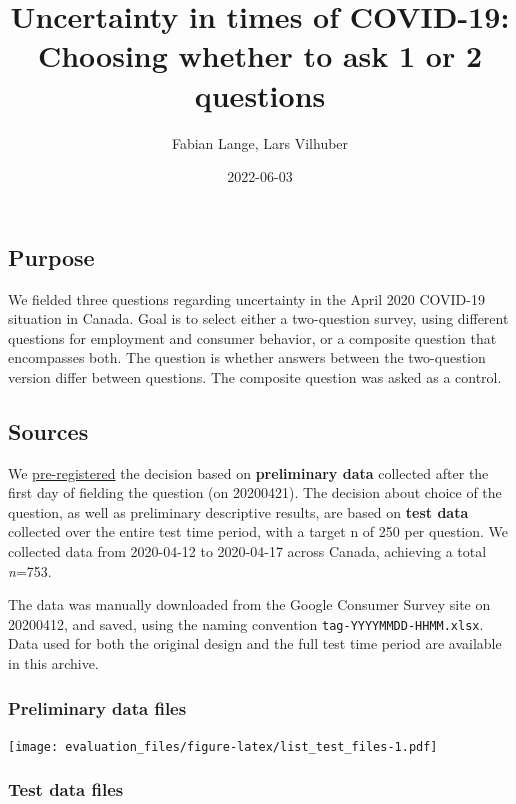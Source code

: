 \documentclass[
]{article}
\title{Uncertainty in times of COVID-19: Choosing whether to ask 1 or 2
questions}
\author{Fabian Lange, Lars Vilhuber}
\date{2022-06-03}
\begin{document}
\maketitle

{
\setcounter{tocdepth}{2}
\tableofcontents
}
\hypertarget{purpose}{%
\subsection{Purpose}\label{purpose}}

We fielded three questions regarding uncertainty in the April 2020
COVID-19 situation in Canada. Goal is to select either a two-question
survey, using different questions for employment and consumer behavior,
or a composite question that encompasses both. The question is whether
answers between the two-question version differ between questions. The
composite question was asked as a control.

\hypertarget{sources}{%
\subsection{Sources}\label{sources}}

We \href{https://osf.io/729nr}{pre-registered} the decision based on
\textbf{preliminary data} collected after the first day of fielding the
question (on 20200421). The decision about choice of the question, as
well as preliminary descriptive results, are based on \textbf{test data}
collected over the entire test time period, with a target n of 250 per
question. We collected data from 2020-04-12 to 2020-04-17 across Canada,
achieving a total \emph{n}=753.

The data was manually downloaded from the Google Consumer Survey site on
20200412, and saved, using the naming convention
\texttt{tag-YYYYMMDD-HHMM.xlsx}. Data used for both the original design
and the full test time period are available in this archive.

\hypertarget{preliminary-data-files}{%
\subsubsection{Preliminary data files}\label{preliminary-data-files}}

\texttt{[image: evaluation\_files/figure-latex/list\_test\_files-1.pdf]}

\hypertarget{test-data-files}{%
\subsubsection{Test data files}\label{test-data-files}}
\end{document}
